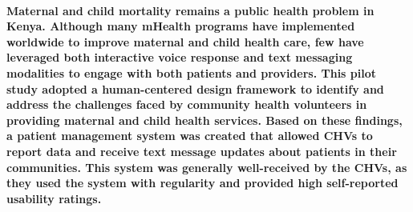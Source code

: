 \paragraph{Maternal and child mortality remains a public health problem in Kenya. Although many mHealth programs have implemented worldwide to improve maternal and child health care, few have leveraged both interactive voice response and text messaging modalities to engage with both patients and providers. This pilot study adopted a human-centered design framework to identify and address the challenges faced by community health volunteers in providing maternal and child health services. Based on these findings, a patient management system was created that allowed CHVs to report data and receive text message updates about patients in their communities. This system was generally well-received by the CHVs, as they used the system with regularity and provided high self-reported usability ratings.}
